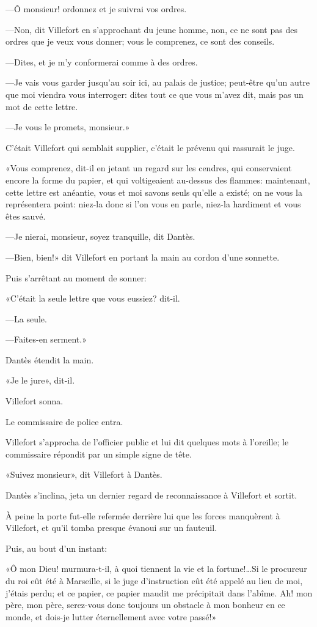 —Ô monsieur! ordonnez et je suivrai vos ordres.

—Non, dit Villefort en s'approchant du jeune homme, non, ce ne sont pas des ordres que je veux vous donner; vous le comprenez, ce sont des conseils.

—Dites, et je m'y conformerai comme à des ordres.

—Je vais vous garder jusqu'au soir ici, au palais de justice; peut-être qu'un autre que moi viendra vous interroger: dites tout ce que vous m'avez dit, mais pas un mot de cette lettre.

—Je vous le promets, monsieur.»

C'était Villefort qui semblait supplier, c'était le prévenu qui rassurait le juge.

«Vous comprenez, dit-il en jetant un regard sur les cendres, qui conservaient encore la forme du papier, et qui voltigeaient au-dessus des flammes: maintenant, cette lettre est anéantie, vous et moi savons seuls qu'elle a existé; on ne vous la représentera point: niez-la donc si l'on vous en parle, niez-la hardiment et vous êtes sauvé.

—Je nierai, monsieur, soyez tranquille, dit Dantès.

—Bien, bien!» dit Villefort en portant la main au cordon d'une sonnette.

Puis s'arrêtant au moment de sonner:

«C'était la seule lettre que vous eussiez? dit-il.

—La seule.

—Faites-en serment.»

Dantès étendit la main.

«Je le jure», dit-il.

Villefort sonna.

Le commissaire de police entra.

Villefort s'approcha de l'officier public et lui dit quelques mots à l'oreille; le commissaire répondit par un simple signe de tête.

«Suivez monsieur», dit Villefort à Dantès.

Dantès s'inclina, jeta un dernier regard de reconnaissance à Villefort et sortit.

À peine la porte fut-elle refermée derrière lui que les forces manquèrent à Villefort, et qu'il tomba presque évanoui sur un fauteuil.

Puis, au bout d'un instant:

«Ô mon Dieu! murmura-t-il, à quoi tiennent la vie et la fortune!\dots Si le procureur du roi eût été à Marseille, si le juge d'instruction eût été appelé au lieu de moi, j'étais perdu; et ce papier, ce papier maudit me précipitait dans l'abîme. Ah! mon père, mon père, serez-vous donc toujours un obstacle à mon bonheur en ce monde, et dois-je lutter éternellement avec votre passé!»

